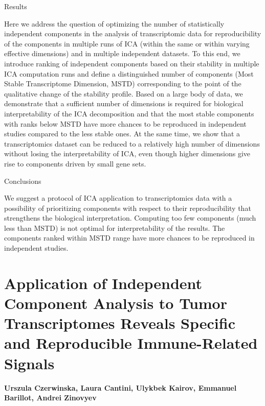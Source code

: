 \documentclass[12pt,]{book}
\theoremstyle{definition}
\theoremstyle{definition}
\theoremstyle{definition}
\theoremstyle{remark}
\begin{document}
Results

Here we address the question of optimizing the number of statistically
independent components in the analysis of transcriptomic data for
reproducibility of the components in multiple runs of ICA (within the
same or within varying effective dimensions) and in multiple independent
datasets. To this end, we introduce ranking of independent components
based on their stability in multiple ICA computation runs and define a
distinguished number of components (Most Stable Transcriptome Dimension,
MSTD) corresponding to the point of the qualitative change of the
stability profile. Based on a large body of data, we demonstrate that a
sufficient number of dimensions is required for biological
interpretability of the ICA decomposition and that the most stable
components with ranks below MSTD have more chances to be reproduced in
independent studies compared to the less stable ones. At the same time,
we show that a transcriptomics dataset can be reduced to a relatively
high number of dimensions without losing the interpretability of ICA,
even though higher dimensions give rise to components driven by small
gene sets.

Conclusions

We suggest a protocol of ICA application to transcriptomics data with a
possibility of prioritizing components with respect to their
reproducibility that strengthens the biological interpretation.
Computing too few components (much less than MSTD) is not optimal for
interpretability of the results. The components ranked within MSTD range
have more chances to be reproduced in independent studies.

\citep{Kairov2017}



\hypertarget{lva}{%
\chapter{Application of Independent Component Analysis to Tumor
Transcriptomes Reveals Specific and Reproducible Immune-Related
Signals}\label{lva}}


\textbf{Urszula Czerwinska, Laura Cantini, Ulykbek Kairov, Emmanuel
Barillot, Andrei Zinovyev}
\end{document}
